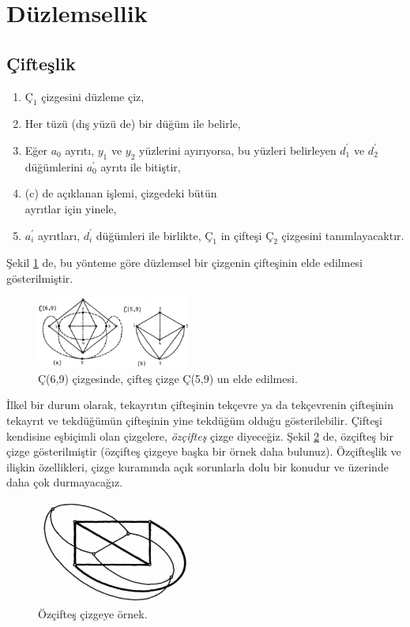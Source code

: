 \documentclass[11pt]{amsbook}
\begin{document}
\setcounter{page}{210}
\setcounter{section}{3}


\renewcommand{\theenumi}{\alph{enumi}}
\section{Düzlemsellik}
\setcounter{subsection}{2}
\subsection{Çifteşlik}
\begin{enumerate}
	\item $Ç_1$ çizgesini düzleme çiz,
	\item Her tüzü (dış yüzü de) bir düğüm ile belirle,
	\item Eğer $a_0$ ayrıtı, $y_1$ ve $y_2$ yüzlerini ayırıyorsa, bu yüzleri belirleyen $d_1^{\prime}$ ve $d_2^{\prime}$ düğümlerini $a_0^{\prime}$ ayrıtı ile bitiştir, 
	\item (c) de açıklanan işlemi, çizgedeki bütün \\
		ayrıtlar için yinele,
	\item $a_i^{\prime}$ ayrıtları, $d_i^{\prime}$ düğümleri ile birlikte, $Ç_1$ in çifteşi $Ç_2$ çizgesini tanımlayacaktır.
\end{enumerate}

Şekil \ref{sekil1} de, bu yönteme göre düzlemsel bir çizgenin çifteşinin elde edilmesi gösterilmiştir. 
\setcounter{figure}{1}
\begin{figure}[htb]
	\centering
	\includegraphics[width=0.45\textwidth]{images/ceyhun-210-fig01}
	\caption{Ç(6,9) çizgesinde, çifteş çizge Ç(5,9) un elde edilmesi.}
	\label{sekil1}
\end{figure}

İlkel bir durum olarak, tekayrıtın çifteşinin 
tekçevre ya da tekçevrenin çifteşinin tekayrıt ve
tekdüğümün çifteşinin yine tekdüğüm olduğu
gösterilebilir. Çifteşi kendisine eşbiçimli olan
çizgelere, \textit{özçifteş} çizge diyeceğiz. Şekil
\ref{sekil2} de, özçifteş bir çizge gösterilmiştir
(özçifteş çizgeye başka bir örnek daha bulunuz).
Özçifteşlik ve ilişkin özellikleri, çizge kuramında
açık sorunlarla dolu bir konudur ve üzerinde daha
çok durmayacağız. 


\begin{figure}[htb]
	\centering
	\includegraphics[width=0.45\textwidth]{images/ceyhun-210-fig02}
	\caption{Özçifteş çizgeye örnek.}
	\label{sekil2}
\end{figure}
\end{document}

